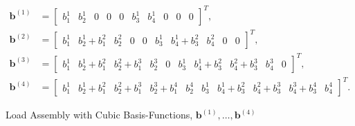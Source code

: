 \begin{figure}[H]
	\centering
	\begin{equation*}
	\begin{aligned}
	\mathbf{b}^{\left( 1 \right)} &=
	\begin{bmatrix}
	b_{1}^{1} & b_{2}^{1} & 0 & 0 & 0 & b_{3}^{1} & b_{4}^{1} & 0 & 0 & 0
	\end{bmatrix}^{T},	\\
	\mathbf{b}^{\left( 2 \right)} &=
	\begin{bmatrix}
	b_{1}^{1} & b_{2}^{1} + b_{1}^{2} & b_{2}^{2} & 0 & 0 & b_{3}^{1} & b_{4}^{1} + b_{3}^{2} & b_{4}^{2} & 0 & 0
	\end{bmatrix}^{T},	\\
	\mathbf{b}^{\left( 3 \right)} &=
	\begin{bmatrix}
	b_{1}^{1} & b_{2}^{1} + b_{1}^{2} & b_{2}^{2} + b_{1}^{3} & b_{2}^{3} & 0 & b_{3}^{1} & b_{4}^{1} + b_{3}^{2} &
	b_{4}^{2} + b_{3}^{3} & b_{4}^{3} & 0
	\end{bmatrix}^T,	\\
	\mathbf{b}^{\left( 4 \right)} &=
	\begin{bmatrix}
	b_{1}^{1} & b_{2}^{1} + b_{1}^{2} & b_{2}^{2} + b_{1}^{3} & b_{2}^{3} + b_{1}^{4} & b_{2}^{4} & b_{3}^{1} &
	b_{4}^{1} + b_{3}^{2} & b_{4}^{2} + b_{3}^{3} & b_{4}^{3} + b_{3}^{4} & b_{4}^{4}
	\end{bmatrix}^{T}.
	\end{aligned}
	\end{equation*}
	\caption{Load Assembly with Cubic Basis-Functions, $\mathbf{b}^{\left(1\right)}, \dots, \mathbf{b}^{\left(4\right)}$}
	\label{fig:b_1_To_b_4_Cubic}
\end{figure}
%